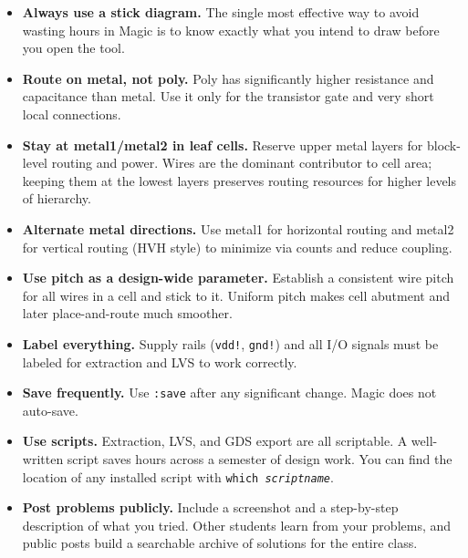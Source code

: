 \documentclass[11pt]{article}
\begin{document}
\begin{itemize}[leftmargin=2em]
  \item \textbf{Always use a stick diagram.}
        The single most effective way to avoid wasting hours in Magic is
        to know exactly what you intend to draw before you open the
        tool.

  \item \textbf{Route on metal, not poly.}
        Poly has significantly higher resistance and capacitance than
        metal.
        Use it only for the transistor gate and very short local
        connections.

  \item \textbf{Stay at metal1/metal2 in leaf cells.}
        Reserve upper metal layers for block-level routing and power.
        Wires are the dominant contributor to cell area; keeping them
        at the lowest layers preserves routing resources for higher
        levels of hierarchy.

  \item \textbf{Alternate metal directions.}
        Use metal1 for horizontal routing and metal2 for vertical
        routing (HVH style) to minimize via counts and reduce coupling.

  \item \textbf{Use pitch as a design-wide parameter.}
        Establish a consistent wire pitch for all wires in a cell and
        stick to it.
        Uniform pitch makes cell abutment and later place-and-route
        much smoother.

  \item \textbf{Label everything.}
        Supply rails (\texttt{vdd!}, \texttt{gnd!}) and all I/O
        signals must be labeled for extraction and LVS to work
        correctly.

  \item \textbf{Save frequently.}
        Use \texttt{:save} after any significant change.
        Magic does not auto-save.

  \item \textbf{Use scripts.}
        Extraction, LVS, and GDS export are all scriptable.
        A well-written script saves hours across a semester of design
        work.
        You can find the location of any installed script with
        \texttt{which \textit{scriptname}}.

  \item \textbf{Post problems publicly.}
        Include a screenshot and a step-by-step description of what
        you tried.
        Other students learn from your problems, and public posts build
        a searchable archive of solutions for the entire class.
\end{itemize}
\end{document}
